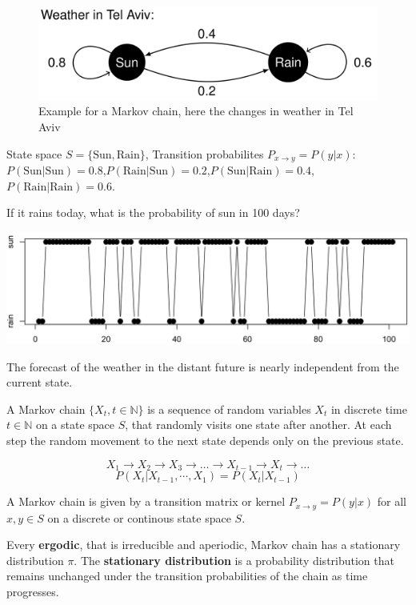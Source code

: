 \documentclass[11pt]{article}
\begin{document}
\begin{figure}[H]
	\centering
	\includegraphics[width=0.6\linewidth]{img/markov_chain_example}
	\caption{Example for a Markov chain, here the changes in weather in Tel Aviv}
	\label{fig:markovchainexample}
\end{figure}

\noindent
State space $S =\{\text{Sun}, \text{Rain}\}$, Transition probabilites $P_{x\rightarrow y} = P(y|x)$: $P(\text{Sun}|\text{Sun}) = 0.8$,$P(\text{Rain}|\text{Sun})=0.2$,$P(\text{Sun}|\text{Rain})=0.4$,$P(\text{Rain}|\text{Rain})=0.6$.

If it rains today, what is the probability of sun in 100 days?
\begin{center}
	\includegraphics[width=0.7\linewidth]{img/markov_chain_example_analysis}
\end{center}
The forecast of the weather in the distant future is nearly independent from the current state.

\begin{theorem}
	A Markov chain $\{X_t ,t \in \mathbb{N}\}$ is a sequence of random variables $X_t$ in discrete time $t \in \mathbb{N}$ on a state space $S$, that randomly visits one state after another. At each step the random movement to the next state depends only on the previous state.
	
	$$ X_1 \rightarrow X_2 \rightarrow X_3 \rightarrow \dots \rightarrow X_{t-1} \rightarrow X_t \rightarrow \dots $$
	$$ P(X_t|X_{t-1},\cdots,X_1) = P(X_t|X_{t-1}) $$
	
	A Markov chain is given by a transition matrix or kernel $P_{x\rightarrow y} = P(y|x)$ for all $x,y \in S$ on a discrete or continous state space $S$.
\end{theorem}

Every \textbf{ergodic}, that is irreducible and aperiodic, Markov chain has a stationary distribution $\pi$. The \textbf{stationary distribution} is a probability distribution that remains unchanged under the transition probabilities of the chain as time progresses.
\end{document}
